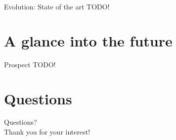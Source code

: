 \documentclass[12pt]{beamer}
\begin{document}
\begin{frame}[fragile]{Evolution: State of the art}
	TODO!	
\end{frame}

\section{A glance into the future}
\begin{frame}[fragile]{Prospect}
	TODO!	
\end{frame}

\section{Questions}
\begin{frame}[standout]
	Questions? \\
	Thank you for your interest!
\end{frame}
\end{document}
